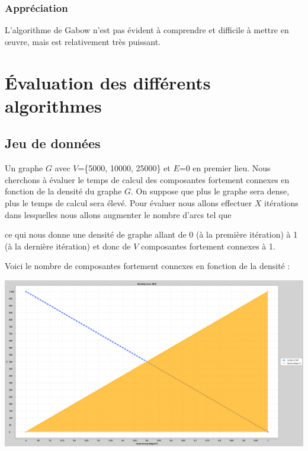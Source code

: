 \documentclass[11pt,a4paper]{article}
\begin{document}
\subsubsection{Appréciation}
L'algorithme de Gabow n'est pas évident à comprendre et difficile à mettre en œuvre, mais est relativement très puissant.

\pagebreak
\section{Évaluation des différents algorithmes}

\subsection{Jeu de données}

Un graphe $G$ avec $V$=\{5000, 10000, 25000\} et $E$=0 en premier lieu.\linebreak
Nous cherchons à évaluer le temps de calcul des composantes fortement connexes en fonction de la densité du graphe $G$. On suppose que plus le graphe sera dense, plus le temps de calcul sera élevé.
Pour évaluer nous allons effectuer $X$ itérations dans lesquelles nous allons augmenter le nombre d'arcs tel que

\begin{algorithm}
\end{algorithm}

ce qui nous donne une densité de graphe allant de 0 (à la première itération) à 1 (à la dernière itération) et donc  de $V$ composantes fortement connexes à 1.

Voici le nombre de composantes fortement connexes en fonction de la densité : 

\begin{center}
\includegraphics[keepaspectratio=true,width=\linewidth]{./Density-SCC.png}
\end{center}
\end{document}
